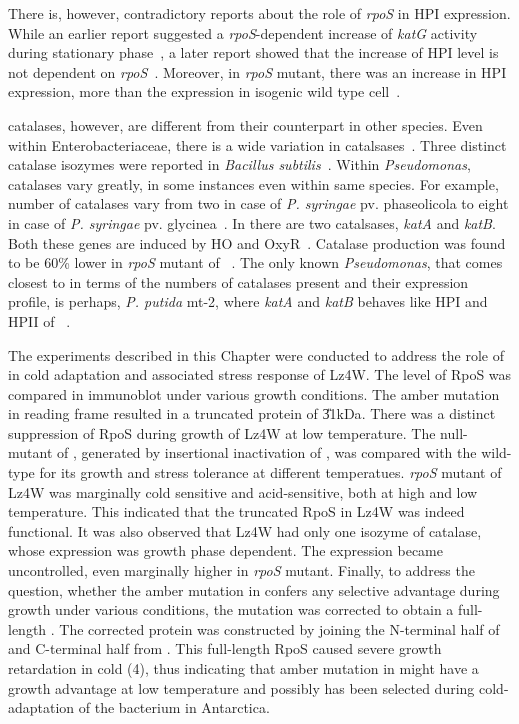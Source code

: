 There is, however, contradictory reports about the role of
\emph{rpoS} in HPI expression. While an earlier report suggested a
\emph{rpoS}-dependent increase of \emph{katG} activity during
stationary phase~\citep{Ivanova1994}, a later report showed that
the increase of HPI level is not dependent on
\emph{rpoS}~\citep{Visick1997}. Moreover, in \emph{rpoS} mutant,
there was an increase in HPI expression, more than the expression
in isogenic wild type cell~\citep{Visick1997}.

 catalases, however, are different from their counterpart
in other species. Even within Enterobacteriaceae, there is a wide
variation in catalsases~\citep{Switala1990}. Three distinct
catalase isozymes were reported in \emph{Bacillus
subtilis}~\citep{Loewen1987}. Within \emph{Pseudomonas}, catalases
vary greatly, in some instances even within same species. For
example, number of catalases vary from two in case of \emph{P.
syringae} pv. phaseolicola to eight in case of \emph{P. syringae}
pv. glycinea~\citep{Klotz1992}. In  there are two
catalsases, \emph{katA} and \emph{katB}. Both these genes are
induced by HO and
OxyR~\citep{Ochsner2000,Hassett2000,Fredrick2001}. Catalase
production was found to be 60\% lower in \emph{rpoS} mutant of
~\citep{Suh1999}. The only known \emph{Pseudomonas}, that
comes closest to  in terms of the numbers of catalases
present and their expression profile, is perhaps, \emph{P. putida}
mt-2, where \emph{katA} and \emph{katB} behaves like HPI and HPII
of ~\citep{Miura1998}.

The experiments described in this Chapter were conducted to
address the role of \lzsig{} in cold adaptation and associated
stress response of Lz4W. The level of RpoS was compared in
immunoblot under various growth conditions. The amber mutation in
\lzsig{} reading frame resulted in a truncated protein of
\U{31}{kDa}. There was a distinct suppression of RpoS during
growth of Lz4W at low temperature. The null-mutant of ,
generated by insertional inactivation of , was compared
with the wild-type for its growth and stress tolerance at
different temperatues. \emph{rpoS} mutant of Lz4W was marginally
cold sensitive and acid-sensitive, both at high and low
temperature. This indicated that the truncated RpoS in Lz4W was
indeed functional. It was also observed that Lz4W had only one
isozyme of catalase, whose expression was growth phase dependent.
The expression became uncontrolled, even marginally higher in
\emph{rpoS} mutant. Finally, to address the question, whether the
amber mutation in \lzsig{} confers any selective advantage during
growth under various conditions, the mutation was corrected to
obtain a full-length . The corrected protein was
constructed by joining the N-terminal half of \lzsig{} and
C-terminal half from \pasig{}. This full-length RpoS caused severe
growth retardation in cold (4\dg{}), thus indicating that amber
mutation in \lzsig{} might have a growth advantage at low
temperature and possibly has been selected during cold-adaptation
of the bacterium in Antarctica.

